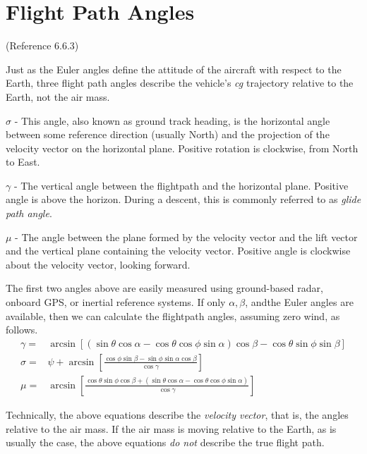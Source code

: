 \documentclass[
]{book}
\providecommand{\tightlist}{%
  \setlength{\itemsep}{0pt}\setlength{\parskip}{0pt}}
\begin{document}
\hypertarget{flight-path-angles}{%
\section{Flight Path Angles}\label{flight-path-angles}}

(Reference 6.6.3)

Just as the Euler angles define the attitude of the aircraft with respect to the Earth, three flight path angles describe the vehicle's \emph{cg} trajectory relative to the Earth, not the air mass.

\begin{description}
\tightlist
\item[Flight path heading angle]
\(\sigma\) - This angle, also known as ground track heading, is the horizontal angle between some reference direction (usually North) and the projection of the velocity vector on the horizontal plane. Positive rotation is clockwise, from North to East.
\item[Flight path elevation angle]
\(\gamma\) - The vertical angle between the flightpath and the horizontal plane. Positive angle is above the horizon. During a descent, this is commonly referred to as \emph{glide path angle}.
\item[Flight path bank angle]
\(\mu\) - The angle between the plane formed by the velocity vector and the lift vector and the vertical plane containing the velocity vector. Positive angle is clockwise about the velocity vector, looking forward.
\end{description}

The first two angles above are easily measured using ground-based radar, onboard GPS, or inertial reference systems. If only \(\alpha, \beta\), andthe Euler angles are available, then we can calculate the flightpath angles, assuming zero wind, as follows.
\begin{align}
\gamma =& \arcsin [(\sin\theta  \cos\alpha - \cos\theta  \cos\phi  \sin\alpha) \cos\beta - \cos\theta  \sin\phi  \sin\beta] \\
\sigma =& \psi + \arcsin \left[\frac{\cos\phi \sin\beta - \sin\phi \sin\alpha \cos\beta}{\cos\gamma} \right]\\
\mu =& \arcsin\left[ \frac{\cos\theta \sin\phi \cos\beta + 
(\sin\theta \cos\alpha -\cos\theta \cos\phi \sin\alpha)}{\cos\gamma}  \right]
\end{align}

Technically, the above equations describe the \emph{velocity vector}, that is, the angles relative to the air mass. If the air mass is moving relative to the Earth, as is usually the case, the above equations \emph{do not} describe the true flight path.
\end{document}

